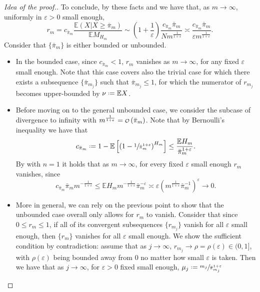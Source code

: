 \documentclass[11pt, a4paper, twoside]{article}
\newcommand\smallO{
	\mathchoice
	{{\scriptstyle\mathcal{O}}}{{\scriptstyle\mathcal{O}}}{{\scriptscriptstyle\mathcal{O}}}{\scalebox{.7}{$\scriptscriptstyle\mathcal{O}$}}}
\newcommand*{\defeq}{\mathrel{\vcenter{\baselineskip0.5ex \lineskiplimit0pt
			\hbox{\scriptsize.}\hbox{\scriptsize.}}}=}
\newcommand{\eps}{\varepsilon}
\newcommand{\EE}{\mathbb{E}}
\numberwithin{equation}{section}
\begin{document}
\begin{proof}[Idea of the proof.]
		To conclude, by these facts and  we have that, as $m\longrightarrow\infty$, uniformly in $\eps>0$ small enough,
		\begin{equation*}
			r_m=c_{\bar{\pi}_m} \frac{\EE(X|X\ge\bar{\pi}_m)}{\EE M_{H_m}}\sim\left(1+\frac{1}{\eps}\right)\frac{c_{\bar{\pi}_m} \bar{\pi}_m}{Nm^{\frac{1}{1+\eps}}}\asymp \frac{c_{\bar{\pi}_m} \bar{\pi}_m}{\eps m^{\frac{1}{1+\eps}}}.
		\end{equation*}
		Consider that $\{\bar{\pi}_m\}$ is either bounded or unbounded.
		\begin{itemize}[noitemsep]
			\item In the bounded case, since $c_{\bar{\pi}_{m}}<1$, $r_m$ vanishes as $m\longrightarrow\infty$, for any fixed $\eps$ small enough. Note that this case covers also the trivial case for which there exists a subsequence $\{\bar{\pi}_{m_j}\}$ such that $\bar{\pi}_{m_j}\le1$, for which the numerator of $r_{m_j}$ becomes upper-bounded by $\nu\defeq\EE X$.
			\item Before moving on to the general unbounded case, we consider the subcase of divergence to infinity with $m^{\frac{1}{1+\eps}}=\smallO\left(\bar{\pi}_m\right)$. Note that by Bernoulli's inequality 
we have that \[c_{\bar{\pi}_{m}}\defeq1-\EE\left[\left(1-\sfrac{1}{\bar{\pi}_{m}^{1+\eps}}\right)^{H_{m}}\right]\le\frac{\EE H_{m}}{\bar{\pi}_{m}^{1+\eps}}.\] By  with $n=1$ it holds that as $m\longrightarrow\infty$, for every fixed $\eps$ small enough $r_m$ vanishes, since
			\[c_{\bar{\pi}_{m}} \bar{\pi}_{m} m^{-\frac{1}{1+\eps}}\le \EE H_m m^{-\frac{1}{1+\eps}}\bar{\pi}_m^{-\eps}\asymp \varepsilon\left(m^{\frac{1}{1+\eps}}\bar{\pi}_m^{-1}\right)^{\eps}\longrightarrow 0.\]
			\item More in general, we can rely on the previous point to show that the unbounded case overall only allows for $r_m$ to vanish. Consider that since $0\le r_m\le 1$, if all of its convergent subsequences $\{r_{m_j}\}$ vanish for all $\eps$ small enough, then $\{r_{m}\}$ vanishes for all $\eps$ small enough. We show the sufficient condition by contradiction: assume that as $j\longrightarrow\infty$, $r_{m_j}\longrightarrow\rho=\rho(\eps)\in(0,1]$, with $\rho(\eps)$ being bounded away from $0$ no matter how small $\eps$ is taken. Then we have that as $j\longrightarrow\infty$, for $\eps>0$ fixed small enough, $\mu_j\defeq \sfrac{m_j}{\bar{\pi}_{m_j}^{1+\eps}}$

\end{itemize}
\end{proof}
\end{document}
